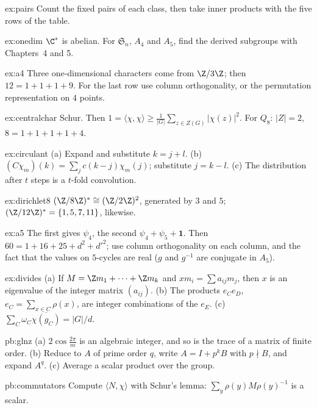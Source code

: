 \begin{hint}{ex:pairs}
Count the fixed pairs of each class, then take inner products with the five rows of the table.
\end{hint}
\begin{hint}{ex:onedim}
$\C^*$ is abelian. For $\mathfrak S_n$, $A_4$ and $A_5$, find the derived subgroups with Chapters~4 and 5.
\end{hint}
\begin{hint}{ex:a4}
Three one-dimensional characters come from $\Z/3\Z$; then $12=1+1+1+9$. For the last row use column orthogonality, or the permutation representation on $4$ points.
\end{hint}
\begin{hint}{ex:centralchar}
Schur. Then $1=\langle\chi,\chi\rangle\ge\frac1{|G|}\sum_{z\in Z(G)}|\chi(z)|^2$. For $Q_8$: $|Z|=2$, $8=1+1+1+1+4$.
\end{hint}
\begin{hint}{ex:circulant}
(a) Expand and substitute $k=j+l$. (b) $(C\chi_m)(k)=\sum_jc(k-j)\chi_m(j)$; substitute $j=k-l$. (c) The distribution after $t$ steps is a $t$-fold convolution.
\end{hint}
\begin{hint}{ex:dirichlet8}
$(\Z/8\Z)^*\cong(\Z/2\Z)^2$, generated by $3$ and $5$; $(\Z/12\Z)^*=\{1,5,7,11\}$, likewise.
\end{hint}
\begin{hint}{ex:a5}
The first gives $\psi_4$, the second $\psi_4+\psi_5+\mathbf1$. Then $60=1+16+25+d^2+d'^2$; use column orthogonality on each column, and the fact that the values on $5$-cycles are real ($g$ and $g^{-1}$ are conjugate in $A_5$).
\end{hint}
\begin{hint}{ex:divides}
(a) If $M=\Z m_1+\dots+\Z m_k$ and $xm_i=\sum a_{ij}m_j$, then $x$ is an eigenvalue of the integer matrix $(a_{ij})$. (b) The products $e_Ce_D$, $e_C=\sum_{x\in C}\rho(x)$, are integer combinations of the $e_E$. (c) $\sum_C\omega_C\overline{\chi(g_C)}=|G|/d$.
\end{hint}

\begin{hint}{pb:glnz}
(a) $2\cos\frac{2\pi}m$ is an algebraic integer, and so is the trace of a matrix of finite order. (b) Reduce to $A$ of prime
order $q$, write $A=I+p^kB$ with $p\nmid B$, and expand $A^q$. (c) Average a scalar product over the group.
\end{hint}

\begin{hint}{pb:commutators}
Compute $\langle N,\chi\rangle$ with Schur's lemma: $\sum_y\rho(y)M\rho(y)^{-1}$ is a scalar.
\end{hint}

